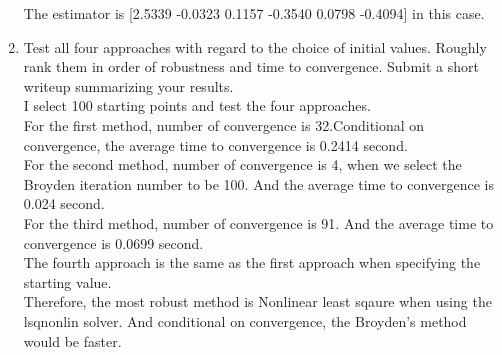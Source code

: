 \documentclass{article}
\begin{document}
\begin{enumerate}
The estimator is [2.5339   -0.0323    0.1157   -0.3540    0.0798   -0.4094] in this case. \\[3em]


\item Test all four approaches with regard to the choice of initial values.  Roughly rank them in order of 
robustness and time to convergence. Submit a short writeup summarizing your results.  \\[2em]

I select 100 starting points  and test the four approaches.\\

For the first method, number of convergence is 32.Conditional on convergence, the average time to convergence is 0.2414 second.\\
For the second method, number of convergence is 4, when we select the Broyden iteration number to be 100. And the average time to convergence is 0.024 second.\\
For the third method, number of convergence is 91. And the average time to convergence is 0.0699 second.\\
The fourth approach is the same as the first approach when specifying the starting value. \\
Therefore, the most robust method is Nonlinear least sqaure when using the lsqnonlin solver. And conditional on convergence, the Broyden's method would be faster. 








\end{enumerate}
\end{document}
